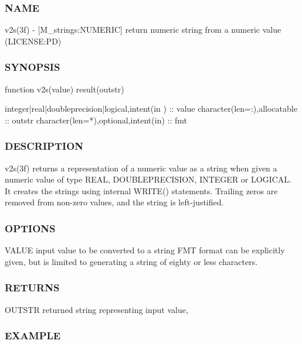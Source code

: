 \subsubsection*{N\+A\+ME}

v2s(3f) -\/ \mbox{[}M\+\_\+strings\+:N\+U\+M\+E\+R\+IC\mbox{]} return numeric string from a numeric value (L\+I\+C\+E\+N\+SE\+:PD) 

\subsubsection*{S\+Y\+N\+O\+P\+S\+IS}

\begin{DoxyVerb}   function v2s(value) result(outstr)

    integer|real|doubleprecision|logical,intent(in ) :: value
    character(len=:),allocatable :: outstr
    character(len=*),optional,intent(in) :: fmt
\end{DoxyVerb}


\subsubsection*{D\+E\+S\+C\+R\+I\+P\+T\+I\+ON}

\begin{DoxyVerb}v2s(3f) returns a representation of a numeric value as a
string when given a numeric value of type REAL, DOUBLEPRECISION,
INTEGER or LOGICAL. It creates the strings using internal WRITE()
statements. Trailing zeros are removed from non-zero values, and the
string is left-justified.
\end{DoxyVerb}


\subsubsection*{O\+P\+T\+I\+O\+NS}

V\+A\+L\+UE input value to be converted to a string F\+MT format can be explicitly given, but is limited to generating a string of eighty or less characters.

\subsubsection*{R\+E\+T\+U\+R\+NS}

O\+U\+T\+S\+TR returned string representing input value,

\subsubsection*{E\+X\+A\+M\+P\+LE}


